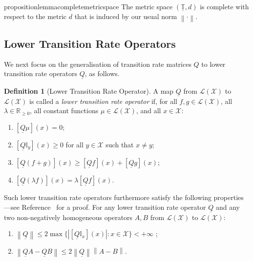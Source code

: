 \documentclass[10pt,a4paper]{paper}
\theoremstyle{definition}
\newtheorem{definition}{Definition}
\newcommand{\reals}{\mathbb{R}}
\newcommand{\realsnonneg}{\reals_{\geq 0}}
\newcommand{\states}{\mathcal{X}}
\newcommand{\gambles}{\mathcal{L}}
\newcommand{\gamblesX}{\gambles(\states)}
\newcommand{\ind}[1]{\mathbb{I}_{#1}}
\newcommand{\lrate}{\underline{Q}}
\newcommand{\norm}[1]{\left\lVert #1 \right\rVert}
\newcommand{\abs}[1]{\left\vert #1 \right\vert}
\begin{document}
\begin{restatable}{proposition}{lemmacompletemetricspace}
\label{lemma:completemetricspace}
The metric space $(\underline{\mathbb{T}},d)$ is complete with respect to the metric $d$ that is induced by our usual norm $\norm{\cdot}$.
\end{restatable}

\subsection{Lower Transition Rate Operators}\label{sec:connections_rate}

We next focus on the generalisation of transition rate matrices $Q$ to lower transition rate operators $\lrate$, as follows.
\begin{definition}[Lower Transition Rate Operator]\label{def:coh_low_trans_rate}
A map $\lrate$ from $\gamblesX$ to $\gamblesX$ is called a \emph{lower transition rate operator} if, for all $f,g\in\gamblesX$, all $\lambda\in\realsnonneg$, all constant functions $\mu\in\gamblesX$, and all $x\in\states$:

\begin{enumerate}[label=LR\arabic*:,ref=LR\arabic*]
\item\label{LR:constantzero}
$\left[\lrate\mu\right](x)=0$;
\item\label{LR:nondiagpos}
$\left[\lrate\ind{y}\right](x)\geq0$ for all $y\in\states$ such that $x\neq y$;
\item\label{LR:subadditive}
$\left[\lrate(f+g)\right](x)\geq\left[\lrate f\right](x)+\left[\lrate g\right](x)$;
\item\label{LR:homo}
$\left[\lrate(\lambda f)\right](x)= \lambda\left[\lrate f\right](x)$.
\end{enumerate}
Such lower transition rate operators furthermore satisfy the following properties---see Reference~\cite{DeBock:2016} for a proof. For any lower transition rate operator $\lrate$ and any two non-negatively homogeneous operators $A,B$ from $\gamblesX$ to $\gamblesX$:
\begin{enumerate}[label=LR\arabic*:,ref=LR\arabic*,start=5]
\item
$\norm{\lrate}\leq 2\max\big\{\abs{[\lrate\ind{x}](x)}\colon x\in\states\big\} < +\infty$ \label{LR:normlratefinite};
\item
$\norm{\lrate A - \lrate B} \leq 2\norm{\lrate}\norm{A - B}.$ \label{LR:differenceofnorm}
\end{enumerate}
\vspace{0pt}
\end{definition}
\end{document}
